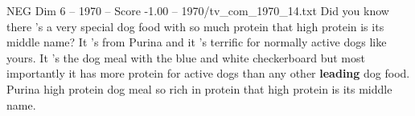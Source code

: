 \begin{textsample}{NEG Dim 6 – 1970 – Score -1.00 – 1970/tv\_com\_1970\_14.txt}  \label{ex:f6_neg_070}
Did you know there 's a very special dog food with so much protein that high protein is its middle name?
It 's from Purina and it 's terrific for normally active dogs like yours.
It 's the dog meal with the blue and white checkerboard but most importantly it has more protein for active dogs than any other \textbf{leading} dog food.
Purina high protein dog meal so rich in protein that high protein is its middle name.

\end{textsample}
